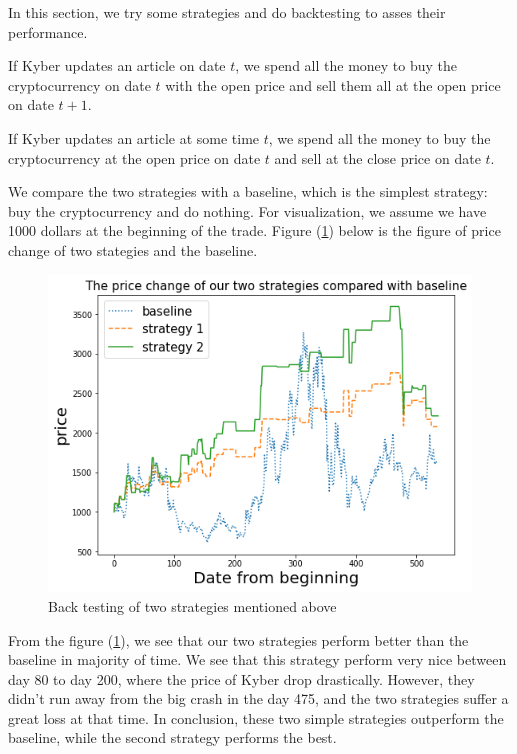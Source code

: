 \documentclass[twoside]{report}
\begin{document}
\begin{spacing}{1}
In this section, we try some strategies and do backtesting to asses their performance. 

\begin{strategy}
If Kyber updates an article on date $t$, we spend all the money to buy the cryptocurrency on date $t$ with the open price and sell them all at the open price on date $t+1$.
\end{strategy}\label{strat:Kyber1}

\begin{strategy}
If Kyber updates an article at some time $t$, we spend all the money to buy the cryptocurrency at the open price on date $t$ and sell at the close price on date $t$.
\end{strategy}\label{strat:Kyber2} 

We compare the two strategies with a baseline, which is the simplest strategy: buy the cryptocurrency and do nothing. For visualization, we assume we have 1000 dollars at the beginning of the trade. Figure (\ref{backtest medium}) below is the figure of price change of two stategies and the baseline.


\begin{figure}[!htbp]
    \centering
    \includegraphics[scale =  0.8]{Images/medium backtesting.png}
    \caption{Back testing of two strategies mentioned above }
    \label{backtest medium}
\end{figure}

From the figure (\ref{backtest medium}), we see that our two strategies perform better than the baseline in majority of time. We see that this strategy perform very nice between day 80 to day 200, where the price of Kyber drop drastically. However, they didn't run away from the big crash in the day 475, and the two strategies suffer a great loss at that time. In conclusion, these two simple strategies outperform the baseline, while the second strategy performs the best.







\end{spacing}
\end{document}
